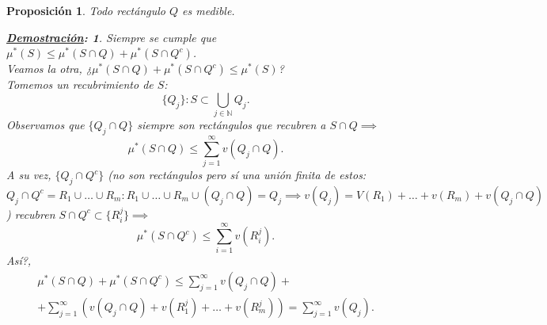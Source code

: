 \documentclass[10pt,a4paper,openright]{book}
\theoremstyle{break}
\newtheorem*{prop}{Proposición}
\newtheorem*{demo}{\underline{Demostración}:}
\begin{document}
\begin{prop}
   Todo rectángulo $Q$ es medible. 
   \begin{demo}
        Siempre se cumple que $ \mu^*\left( S \right) \le \mu^*\left( S\cap Q \right) + \mu^*\left( S\cap Q^c \right)$.\\
        Veamos la otra, ¿$ \mu^*\left( S\cap Q \right) + \mu^*\left( S\cap Q^c \right) \le \mu^*\left( S \right)$?\\
        Tomemos un recubrimiento de $S$: \[
            \{Q_j\}: S \subset \bigcup_{j \in \mathbb{N}} Q_j 
        .\] 
        Observamos que $ \{Q_j \cap Q\} $ siempre son rectángulos que recubren a $S\cap Q\implies$ \[
        \mu^*\left( S\cap Q \right) \le \sum_{j=1}^{\infty} v\left( Q_j \cap Q \right) 
        .\] 
        A su vez, $ \{Q_j \cap Q^c\}$ (no son rectángulos pero sí una unión finita de estos: $Q_j \cap Q^c = R_1 \cup \ldots \cup R_m: R_1 \cup \ldots \cup R_m \cup \left( Q_j \cap Q \right) = Q_j \implies v\left( Q_j \right) = V\left( R_1 \right) +\ldots + v\left( R_m \right) + v\left( Q_j\cap Q \right) $) recubren $S \cap Q^c \subset \{R_i^j\}  \implies$ \[
            \mu^*\left( S\cap Q^c \right) \le \sum_{i=1}^{\infty} v\left( R^j_i \right) 
        .\] 
        Así?, 
        \begin{gather*}
            \mu^*\left( S\cap Q \right) + \mu^*\left( S \cap Q^c \right) \le \sum_{j=1}^{\infty} v\left( Q_j \cap Q \right) +\\
            + \sum_{j=1}^{\infty} \left( v\left( Q_j\cap Q \right) + v\left( R_1^j \right) +\ldots + v\left( R_m^j \right) \right) = \sum_{j=1}^{\infty} v\left( Q_j \right) 
        .\end{gather*}
   \end{demo}
\end{prop}
\end{document}
